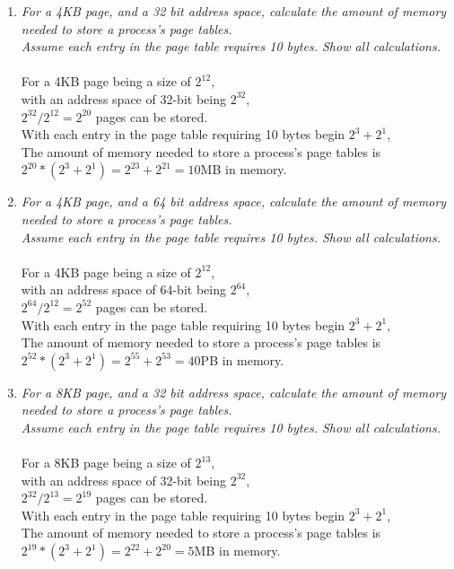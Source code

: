 \documentclass[letterpaper,10pt,onecolumn,compsoc]{IEEEtran}
\begin{document}
\begin{enumerate}

\item \textit{For a 4KB page, and a 32 bit address space, calculate the amount of memory needed to store a process's page tables. \\Assume each entry in the page table requires 10 bytes. Show all calculations.}
\\ ~ \\
For a 4KB page being a size of $2^{12}$, \\
with an address space of 32-bit being $2^{32}$, \\
$2^{32}/2^{12} = 2^{20}$ pages can be stored. \\
With each entry in the page table requiring 10 bytes begin $2^{3} + 2^{1}$, \\
The amount of memory needed to store a process's page tables is \\
$2^{20}*(2^{3} + 2^{1}) = 2^{23} + 2^{21} = 10$MB in memory.

\bigskip
\item \textit{For a 4KB page, and a 64 bit address space, calculate the amount of memory needed to store a process's page tables. \\Assume each entry in the page table requires 10 bytes. Show all calculations.}
\\ ~ \\
For a 4KB page being a size of $2^{12}$, \\
with an address space of 64-bit being $2^{64}$, \\
$2^{64}/2^{12} = 2^{52}$ pages can be stored. \\
With each entry in the page table requiring 10 bytes begin $2^{3} + 2^{1}$, \\
The amount of memory needed to store a process's page tables is \\
$2^{52}*(2^{3} + 2^{1}) = 2^{55} + 2^{53} = 40$PB in memory.

\bigskip
\item \textit{For a 8KB page, and a 32 bit address space, calculate the amount of memory needed to store a process's page tables. \\Assume each entry in the page table requires 10 bytes. Show all calculations.}
\\ ~ \\
For a 8KB page being a size of $2^{13}$, \\
with an address space of 32-bit being $2^{32}$, \\
$2^{32}/2^{13} = 2^{19}$ pages can be stored. \\
With each entry in the page table requiring 10 bytes begin $2^{3} + 2^{1}$, \\
The amount of memory needed to store a process's page tables is \\
$2^{19}*(2^{3} + 2^{1}) = 2^{22} + 2^{20} = 5$MB in memory.



\end{enumerate}
\end{document}
